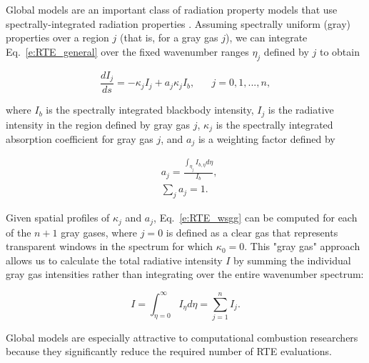 \documentclass[preprint,12pt]{elsarticle}
\newcounter{bla}
\begin{document}
Global models are an important class of radiation property models that use spectrally-integrated radiation properties \cite{Hottel_1967,Modest_2013,Modest_2016}. Assuming spectrally uniform (gray) properties over a region $j$ (that is, for a gray gas $j$), we can integrate Eq.~\ref{e:RTE_general} over the fixed wavenumber ranges $\eta_j$ defined by $j$ to obtain 
%
\begin{linenomath}
\begin{equation} \label{e:RTE_wsgg}
	\frac{dI_j}{ds} = -\kappa_jI_j + a_j\kappa_jI_b, \hspace{20pt} j=0,1,...,n,
\end{equation}
\end{linenomath}
%
where $I_b$ is the spectrally integrated blackbody intensity, $I_j$ is the radiative intensity in the region defined by gray gas $j$, $\kappa_j$ is the spectrally integrated absorption coefficient for gray gas $j$, and $a_j$ is a weighting factor defined by
%
\begin{linenomath}
\begin{align}
    &a_j= \frac{\int_{\eta_j}I_{b,\eta}d\eta}{I_b},\\
    &\sum_j a_j = 1.
\end{align}
\end{linenomath}
%
Given spatial profiles of $\kappa_j$ and $a_j$, Eq.~\ref{e:RTE_wsgg} can be computed for each of the $n+1$ gray gases, where $j=0$ is defined as a clear gas that represents transparent windows in the spectrum for which $\kappa_0=0$. This "gray gas" approach allows us to calculate the total radiative intensity $I$ by summing the individual gray gas intensities rather than integrating over the entire wavenumber spectrum: 
%
\begin{linenomath}
\begin{equation}
	I=\int_{\eta=0}^{\infty}I_{\eta}d\eta=\sum_{j=1}^n I_j.
\end{equation}
\end{linenomath}
%
Global models are especially attractive to computational combustion researchers because they significantly reduce the required number of RTE evaluations. 
\end{document}
